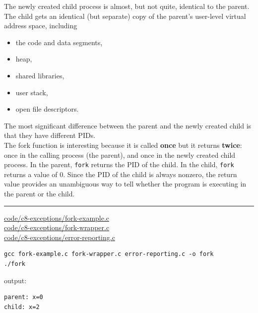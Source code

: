 \documentclass[11pt]{article}
\begin{document}
The newly created child process is almost, but not quite, identical to the parent. The child gets an identical (but separate) copy of the parent’s user-level virtual address space, including\\
\begin{itemize}
\item the code and data segments,\\
\item heap,\\
\item shared libraries,\\
\item user stack,\\
\item open file descriptors.\\
\end{itemize}
The most significant difference between the parent and the newly created child is that they have different PIDs.\\


The fork function is interesting because it is called \textbf{once} but it returns \textbf{twice}: once in the calling process (the parent), and once in the newly created child process. In the parent, \texttt{fork} returns the PID of the child. In the child, \texttt{fork} returns a value of 0. Since the PID of the child is always nonzero, the return value provides an unambiguous way to tell whether the program is executing in the parent or the child.\\

\noindent\rule{\textwidth}{0.5pt}

\url{code/c8-exceptions/fork-example.c}\\
\url{code/c8-exceptions/fork-wrapper.c}\\
\url{code/c8-exceptions/error-reporting.c}\\

\begin{verbatim}
gcc fork-example.c fork-wrapper.c error-reporting.c -o fork
./fork
\end{verbatim}

output:\\
\begin{verbatim}
parent: x=0
child: x=2
\end{verbatim}
\end{document}
